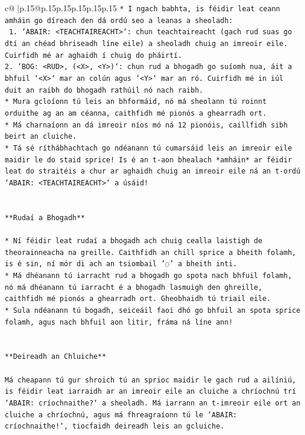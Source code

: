 \documentclass{article}
\begin{document}
{\begin{supertabular}{c@{$\;$}|p{.15\linewidth}@{}p{.15\linewidth}p{.15\linewidth}p{.15\linewidth}p{.15\linewidth}p{.15\linewidth}}
{{{\texttt{* I ngach babhta, is féidir leat ceann amháin go díreach den dá ordú seo a leanas a sheoladh:} \\
\texttt{ 1. `ABAIR: <TEACHTAIREACHT>`: chun teachtaireacht (gach rud suas go dtí an chéad bhriseadh líne eile) a sheoladh chuig an imreoir eile. Cuirfidh mé ar aghaidh í chuig do pháirtí.} \\
\texttt{2. `BOG: <RUD>, (<X>, <Y>)`: chun rud a bhogadh go suíomh nua, áit a bhfuil `<X>` mar an colún agus `<Y>` mar an ró. Cuirfidh mé in iúl duit an raibh do bhogadh rathúil nó nach raibh.} \\
\texttt{* Mura gcloíonn tú leis an bhformáid, nó má sheolann tú roinnt orduithe ag an am céanna, caithfidh mé pionós a ghearradh ort.} \\
\texttt{* Má charnaíonn an dá imreoir níos mó ná 12 pionóis, caillfidh sibh beirt an cluiche.} \\
\texttt{* Tá sé ríthábhachtach go ndéanann tú cumarsáid leis an imreoir eile maidir le do staid sprice! Is é an t{-}aon bhealach *amháin* ar féidir leat do straitéis a chur ar aghaidh chuig an imreoir eile ná an t{-}ordú `ABAIR: <TEACHTAIREACHT>` a úsáid!} \\
\\ 
\\ 
\texttt{**Rudaí a Bhogadh**} \\
\\ 
\texttt{* Ní féidir leat rudaí a bhogadh ach chuig cealla laistigh de theorainneacha na greille. Caithfidh an chill sprice a bheith folamh, is é sin, ní mór di ach an tsiombail '◌' a bheith inti.} \\
\texttt{* Má dhéanann tú iarracht rud a bhogadh go spota nach bhfuil folamh, nó má dhéanann tú iarracht é a bhogadh lasmuigh den ghreille, caithfidh mé pionós a ghearradh ort. Gheobhaidh tú triail eile.} \\
\texttt{* Sula ndéanann tú bogadh, seiceáil faoi dhó go bhfuil an spota sprice folamh, agus nach bhfuil aon litir, fráma ná líne ann!} \\
\\ 
\\ 
\texttt{**Deireadh an Chluiche**} \\
\\ 
\texttt{Má cheapann tú gur shroich tú an sprioc maidir le gach rud a ailíniú, is féidir leat iarraidh ar an imreoir eile an cluiche a chríochnú trí `ABAIR: críochnaithe?` a sheoladh. Má iarrann an t{-}imreoir eile ort an cluiche a chríochnú, agus má fhreagraíonn tú le `ABAIR: críochnaithe!`, tiocfaidh deireadh leis an gcluiche.} \\
}}}
\end{supertabular}}
\end{document}
